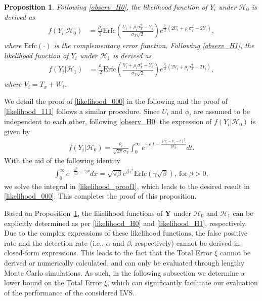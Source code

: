 \documentclass[journal]{IEEEtran}
\newcommand{\Hnull}{\mathcal{H}_0}
\newcommand{\Halt}{\mathcal{H}_1}
\newtheorem{proposition}{\noindent \textbf{Proposition}}
\begin{document}
\begin{proposition}\label{proposition1}
Following \eqref{observ_H0}, the likelihood function of $Y_i$ under $\Hnull$ is derived as
\begin{align}\label{likelihood_000}
f(Y_i|\Hnull) &= \frac{\rho_i}{2}\text{Erfc}\left(\frac{U_i + \rho_i \sigma_T^2 - Y_i}{\sigma_T \sqrt{2}}\right) e^{\frac{\rho_i}{2}(2U_i + \rho_i \sigma_T^2 - 2 Y_i)},
\end{align}
where $\text{Erfc}(\cdot)$ is the complementary error function. Following \eqref{observ_H1}, the likelihood function of $Y_i$ under $\Halt$ is derived as
\begin{align}\label{likelihood_111}
f(Y_i|\Halt) &= \frac{\rho_i}{2}\text{Erfc}\left(\frac{V_i + \rho_i \sigma_T^2 - Y_i}{\sigma_T \sqrt{2}}\right) e^{\frac{\rho_i}{2}(2V_i + \rho_i \sigma_T^2 - 2 Y_i)},
\end{align}
where $V_i = T_x + W_i$.
\end{proposition}
\begin{IEEEproof}
We detail the proof of \eqref{likelihood_000} in the following and the proof of \eqref{likelihood_111} follows a similar procedure.
Since $U_i$ and $\phi_i$ are assumed to be independent to each other, following \eqref{observ_H0} the expression of $f(Y_i|\Hnull)$ is given by
\begin{align}\label{likelihood_proof1}
f(Y_i|\Hnull) = \frac{\rho_i}{\sqrt{2 \pi} \sigma_T}\int_{0}^{\infty}e^{-\rho_i t - \frac{(Y_i - U_i - t)^2}{2 \sigma_T^2}} dt.
\end{align}
With the aid of the following identity \cite[Eq. (3.322.2)]{gradshteuin2007table}
\begin{align}
\int_0^{\infty} e^{-\frac{x^2}{4 \beta}-\gamma x} dx = \sqrt{\pi \beta} e^{\beta \gamma^2}\text{Erfc}(\gamma \sqrt{\beta}), ~\text{for}~\beta > 0,
\end{align}
we solve the integral in \eqref{likelihood_proof1}, which leads to the desired result in \eqref{likelihood_000}. This completes the proof of this proposition.
\end{IEEEproof}

Based on Proposition~\ref{proposition1}, the likelihood functions of $\mathbf{Y}$ under $\Hnull$ and $\Halt$ can be explicitly determined as per \eqref{likelihood_H0} and \eqref{likelihood_H1}, respectively. Due to the complex expressions of these likelihood functions, the false positive rate and the detection rate (i.e., $\alpha$ and $\beta$, respectively) cannot be derived in closed-form expressions. This leads to the fact that the Total Error $\xi$ cannot be derived or numerically calculated, and  can only be evaluated through lengthy Monte Carlo simulations. As such, in the following subsection we determine a lower bound on the Total Error $\xi$, which can significantly facilitate our evaluation of the performance of the considered LVS.
\end{document}
